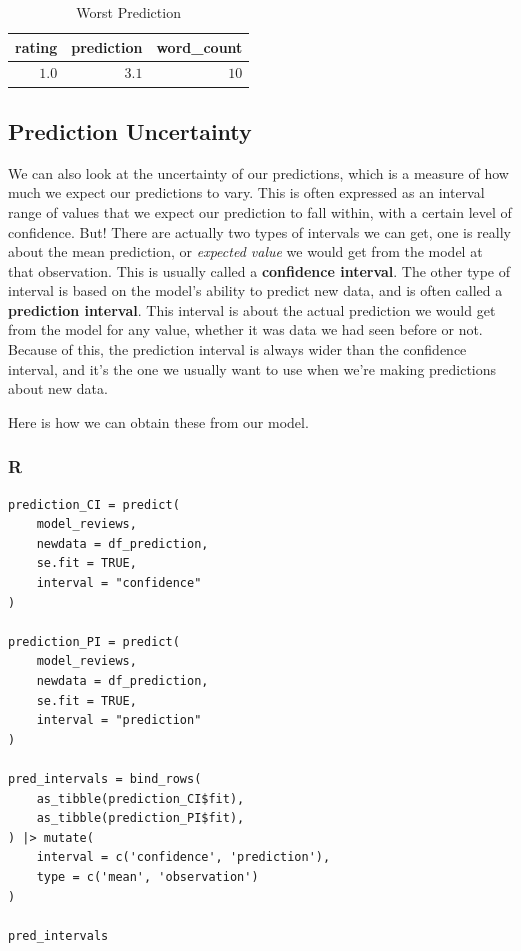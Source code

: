\documentclass[
  letterpaper,
]{krantz}
\begin{document}
\begin{longtable}{rrr}

\caption{\label{tbl-worst-prediction}Worst Prediction}

\tabularnewline

\toprule
rating & prediction & word\_count \\ 
\midrule\addlinespace[2.5pt]
\textcolor[HTML]{404040}{$1.0$} & \textcolor[HTML]{404040}{$3.1$} & \textcolor[HTML]{404040}{$10$} \\ 
\bottomrule

\end{longtable}

\subsection{Prediction Uncertainty}\label{prediction-uncertainty}

We can also look at the uncertainty of our predictions, which is a
measure of how much we expect our predictions to vary. This is often
expressed as an interval range of values that we expect our prediction
to fall within, with a certain level of confidence. But! There are
actually two types of intervals we can get, one is really about the mean
prediction, or \emph{expected value} we would get from the model at that
observation. This is usually called a \textbf{confidence interval}. The
other type of interval is based on the model's ability to predict new
data, and is often called a \textbf{prediction interval}. This interval
is about the actual prediction we would get from the model for any
value, whether it was data we had seen before or not. Because of this,
the prediction interval is always wider than the confidence interval,
and it's the one we usually want to use when we're making predictions
about new data.

Here is how we can obtain these from our model.

\subsubsection{R}

\begin{verbatim}
prediction_CI = predict(
    model_reviews, 
    newdata = df_prediction, 
    se.fit = TRUE, 
    interval = "confidence"
)

prediction_PI = predict(
    model_reviews, 
    newdata = df_prediction, 
    se.fit = TRUE, 
    interval = "prediction"
)

pred_intervals = bind_rows(
    as_tibble(prediction_CI$fit),
    as_tibble(prediction_PI$fit),
) |> mutate(
    interval = c('confidence', 'prediction'),
    type = c('mean', 'observation')
)

pred_intervals
\end{verbatim}
\end{document}
